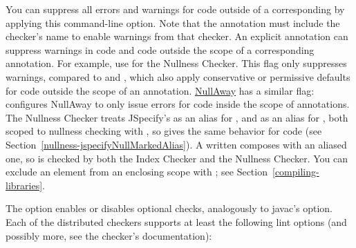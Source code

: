 You can suppress all errors and warnings for code outside of a corresponding
 by applying this command-line option.
Note that the  annotation must include the checker's name to
enable warnings from that checker.
An explicit  annotation can suppress warnings in
 code and code outside the scope of a corresponding
 annotation.
For example, use  for the Nullness Checker.
This flag only suppresses warnings, compared to
 and
,
which also apply conservative or permissive defaults for code outside the scope of an  annotation.
\href{https://github.com/uber/NullAway}{NullAway} has a similar flag: 
configures NullAway to only issue errors for code inside the scope of  annotations.
The Nullness Checker treats JSpecify's  as an alias for
, and  as an alias for ,
both scoped to nullness checking with ,
so  gives the same behavior for  code
(see Section~\ref{nullness-jspecifyNullMarkedAlias}).
A written  composes with an aliased one, so
 is checked by both the Index Checker and the
Nullness Checker.
You can exclude an element from an enclosing  scope with
; see Section~\ref{compiling-libraries}.


The  option enables or disables optional checks, analogously to
javac's  option.
Each of the distributed checkers supports at least the following lint
options (and possibly more, see the checker's documentation):




